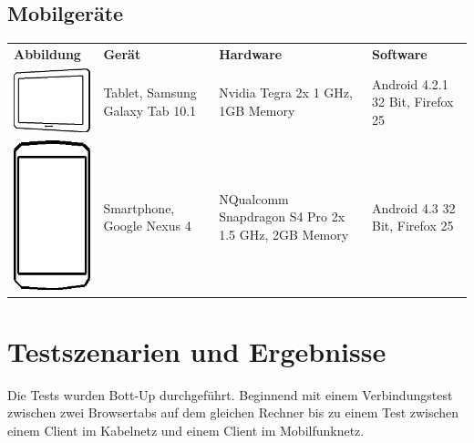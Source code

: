 \begin{landscape}
		\subsection{Mobilgeräte}
		\begin{tabularx}{1.4\textwidth}{|l|XXX|}
			\hline
			\textbf{Abbildung} & \textbf{Gerät} & \textbf{Hardware} & \textbf{Software}\\
			\includegraphics[width=3cm]{../performanceAnalaysis/devices/samsunggalaxy101.jpg} & Tablet, Samsung Galaxy Tab 10.1 & Nvidia Tegra 2x 1 GHz, 1GB Memory & Android 4.2.1 32 Bit, Firefox 25 \\
			\hline
			\includegraphics[width=3cm]{../performanceAnalaysis/devices/googlenexus4.jpg} & Smartphone, Google Nexus 4 & NQualcomm Snapdragon S4 Pro 2x 1.5 GHz, 2GB Memory & Android 4.3 32 Bit, Firefox 25 \\
			\hline
		\end{tabularx}
	
	
	\section{Testszenarien und Ergebnisse}
		Die Tests wurden Bott-Up durchgeführt. Beginnend mit einem Verbindungstest zwischen zwei Browsertabs auf dem gleichen Rechner bis zu einem Test zwischen einem Client im Kabelnetz und einem Client im Mobilfunknetz.
	

\end{landscape}
